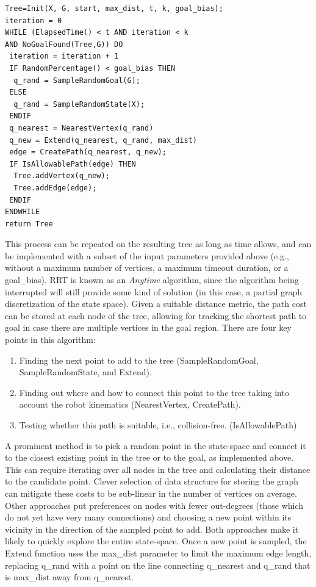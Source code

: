 \begin{verbatim}
Tree=Init(X, G, start, max_dist, t, k, goal_bias);
iteration = 0
WHILE (ElapsedTime() < t AND iteration < k 
AND NoGoalFound(Tree,G)) DO
 iteration = iteration + 1
 IF RandomPercentage() < goal_bias THEN
  q_rand = SampleRandomGoal(G);
 ELSE
  q_rand = SampleRandomState(X);
 ENDIF
 q_nearest = NearestVertex(q_rand)
 q_new = Extend(q_nearest, q_rand, max_dist)
 edge = CreatePath(q_nearest, q_new);
 IF IsAllowablePath(edge) THEN
  Tree.addVertex(q_new);
  Tree.addEdge(edge);
 ENDIF
ENDWHILE
return Tree
\end{verbatim}

This process can be repeated on the resulting tree as long as time allows, and can be implemented with a subset of the input parameters provided above (e.g., without a maximum number of vertices, a maximum timeout duration, or a goal\_bias). RRT is known as an  \textsl{Anytime} algorithm, since the algorithm being interrupted will still provide some kind of solution (in this case, a partial graph discretization of the state space). Given a suitable distance metric, the path cost can be stored at each node of the tree, allowing for tracking the shortest path to goal in case there are multiple vertices in the goal region.
There are four key points in this algorithm:

\begin{enumerate}
    \item Finding the next point to add to the tree (SampleRandomGoal, SampleRandomState, and Extend).
    \item Finding out where and how to connect this point to the tree taking into account the robot kinematics (NearestVertex, CreatePath).
    \item Testing whether this path is suitable, i.e., collision-free. (IsAllowablePath)
\end{enumerate}

A prominent method is to pick a random point in the state-space and connect it to the closest existing point in the tree or to the goal, as implemented above. This can require iterating over all nodes in the tree and calculating their distance to the candidate point. Clever selection of data structure for storing the graph can mitigate these costs to be sub-linear in the number of vertices on average. Other approaches put preferences on nodes with fewer out-degrees (those which do not yet have very many connections) and choosing a new point within its vicinity in the direction of the sampled point to add. Both approaches make it likely to quickly explore the entire state-space. Once a new point is sampled, the Extend function uses the max\_dist parameter to limit the maximum edge length, replacing q\_rand with a point on the line connecting q\_nearest and q\_rand that is max\_dist away from q\_nearest.

